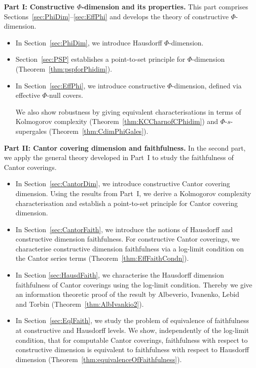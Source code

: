 \documentclass[11pt]{article}
\begin{document}
\medskip
\noindent\textbf{Part I: Constructive $\Phi$-dimension and its properties.}
This part comprises Sections~\ref{sec:PhiDim}--\ref{sec:EffPhi} and
develops the theory of constructive $\Phi$-dimension.
\begin{itemize}
	\item In Section~\ref{sec:PhiDim}, we introduce Hausdorff
	$\Phi$-dimension. 
	
	\item Section~\ref{sec:PSP} establishes a point-to-set principle for
	$\Phi$-dimension (Theorem~\ref{thm:pspforPhidim}). 
	
	\item In Section~\ref{sec:EffPhi}, we introduce constructive
	$\Phi$-dimension, defined via effective $\Phi$-null covers.
	
	We also show robustness by giving equivalent
	characterisations in terms of Kolmogorov complexity
	(Theorem~\ref{thm:KCCharnofCPhidim}) and $\Phi$-$s$-supergales
	(Theorem~\ref{thm:CdimPhiGales}).
\end{itemize}

\medskip
\noindent\textbf{Part II: Cantor covering dimension and faithfulness.}
In the second part, we apply the general theory developed in Part~I to
study the faithfulness of Cantor coverings.
\begin{itemize}
	\item In Section~\ref{sec:CantorDim}, we introduce constructive Cantor covering
	dimension. Using the results from Part~I, we
	derive a Kolmogorov complexity characterisation and establish a
	point-to-set principle for Cantor covering dimension.
	
	\item In Section~\ref{sec:CantorFaith}, we introduce the notions of
	Hausdorff and constructive dimension faithfulness. For constructive Cantor
	coverings, we characterise constructive dimension faithfulness via a
	log-limit condition on the Cantor series terms
	(Theorem~\ref{thm:EffFaithCondn}).
	
	\item In Section \ref{sec:HausdFaith}, we characterise the Hausdorff dimension faithfulness of Cantor coverings using the
	log-limit condition. Thereby we give an information theoretic proof of the result by Albeverio, Ivanenko, Lebid and Torbin  \cite{Albeverio2020} (Theorem~\ref{thm:AlbIvankio2}).
	
	\item In Section~\ref{sec:EqlFaith}, we study the problem of equivalence of faithfulness at constructive and Hausdorff levels.
	We show, independently of the log-limit condition, that
	for computable Cantor coverings, faithfulness with respect to
	constructive dimension is equivalent to faithfulness with respect to
	Hausdorff dimension
	(Theorem~\ref{thm:equivalenceOfFaithfulness}). 
\end{itemize}
\end{document}
